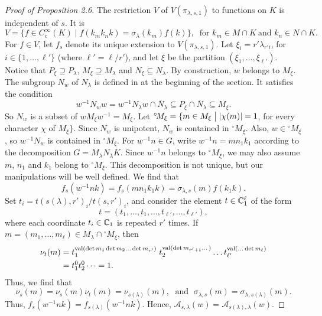 \documentclass{amsart}
\begin{document}
\begin{proof}[Proof of Proposition 2.6]
The restriction $V$ of 
  $V(\pi_{\lambda,s,1})$
to functions on $K$ is independent of $s$.
It is
%
$$
  V =
  \{
    f \in C_c^{\infty} (K) \mid
    f (k_m k_n k ) =
    \sigma_{\lambda} (k_m) f (k)
  \}, \ \text{ for } k_m\in M\cap K
  \ \text{and } k_n\in N\cap K.
$$
%
For
  $ f \in V $,
let 
  $ f_s $
denote its unique extension to
  $ V(\pi_{\lambda,s,1} ) $.
Let
  $ \xi_i = r'\lambda_{r'i} $,
for
  $i\in \{1,\dots,\ell'\}$ (where $\ell'=\ell/r'$),
and let
  $ \xi $
be the partition 
  $ ( \xi_1, \dots, \xi_{\ell'}) $.
Notice that
  $ P_{\xi} \supseteq P_{\lambda} $,
  $ M_{\xi} \supseteq M_{\lambda} $ and
  $ N_{\xi} \subseteq N_{\lambda} $.
By construction,
  $ w$ belongs to $M_{\xi} $.
  The subgroup $N_w$ of $N_\lambda$ is defined in
  at the beginning of the section.  It satisfies the condition
%
$$
  w^{-1} N_w w = 
  w^{-1} N_\lambda w \cap \bar N_\lambda \subseteq 
  P_{\xi} \cap \bar N_\lambda \subseteq
  M_{\xi}.
$$
%
So
  $ N_w $ is a subset of $ w M_{\xi} w^{-1} = M_{\xi} $.
Let 
  $ {}^{\circ}\! M_{\xi} = 
    \{ m \in M_{\xi} \bigm|
       |\chi(m)| = 1 $,
for every character
  $ \chi $
of 
  $ M_{\xi} \} $.
Since
  $ N_w $
is unipotent,
  $ N_w$ is contained in  
    ${}^{\circ} \!M_{\xi} $.
Also,
  $ w \in 
    {}^{\circ} \!M_{\xi} $,
so
  $ w^{-1} N_w$ is contained in 
    ${}^{\circ} \!M_{\xi} $.
For
  $ w^{-1} n \in G $,
write
  $ w^{-1} n = m n_1 k_1 $
according to the decomposition
  $ G = M_{\lambda} N_{\lambda} K $.
Since
  $ w^{-1} n$ belongs to  ${}^{\circ} \!M_{\xi} $,
we may also assume
  $m$, $n_1$ and $k_1$ belong to
    ${}^{\circ} \!M_{\xi} $.
This decomposition is not unique, but our manipulations
  will be well defined.  We find that
%
$$
  f_s (w^{-1}nk) =
  f_s (m n_1 k_1 k) =
  \sigma_{\lambda,s}(m) f (k_1 k).
$$
%
Set $t_i = t(s(\lambda),r')_i/t(s,r')_i$, and
consider the element $t\in {\Bbb C}^\ell_1$ of the form
$$t = (t_1,\ldots,t_1,\ldots ,t_{\ell'},\ldots,t_{\ell'}),$$ where
each coordinate $t_i\in{\Bbb C}_1$ is repeated $r'$ times.
If $m=(m_1,\ldots,m_\ell)\in M_\lambda \cap {}^{\circ}\!M_\xi$,
then
\begin{align*}
 \nu_t (m) &=
   t_1^{%
      \operatorname{val}
      (\det m_1 \det m_2 \dots \det m_{r'}) } \;
   t_2^{%
      \operatorname{val}
      (\det m_{r'+1} \dots) }
    \dots
    t_{\ell'}^{%
      \operatorname{val}(\dots \det m_\ell)}
\\
\vspace{4pt}
  &=
   t_1^0
   t_2^0 \dots = 1.
\end{align*}
%
Thus, we find that
%
$$
  \nu_s (m) =
  \nu_s (m)
  \nu_t(m) =
  \nu_{s(\lambda)} (m), \; \text{ and } \;
  \sigma_{\lambda,s} (m) =
  \sigma_{\lambda,s(\lambda)} (m).
$$
%
Thus,
  $ f_s (w^{-1} nk) =
    f_{s(\lambda)} (w^{-1} nk) $.
Hence, 
  $\mathcal A_{s, \lambda} (w) =
   \mathcal A_{s(\lambda), \lambda} (w) $.
%
\end{proof}
\end{document}
